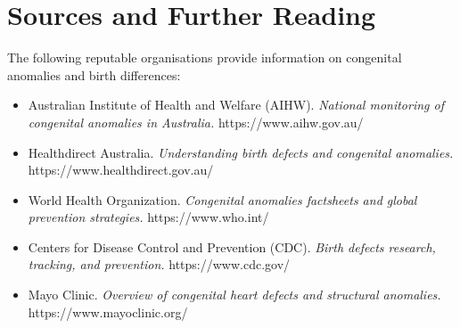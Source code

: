 \section*{Sources and Further Reading}
The following reputable organisations provide information on congenital anomalies and birth differences:
\begin{itemize}
    \item Australian Institute of Health and Welfare (AIHW). \textit{National monitoring of congenital anomalies in Australia.} https://www.aihw.gov.au/
    \item Healthdirect Australia. \textit{Understanding birth defects and congenital anomalies.} https://www.healthdirect.gov.au/
    \item World Health Organization. \textit{Congenital anomalies factsheets and global prevention strategies.} https://www.who.int/
    \item Centers for Disease Control and Prevention (CDC). \textit{Birth defects research, tracking, and prevention.} https://www.cdc.gov/
    \item Mayo Clinic. \textit{Overview of congenital heart defects and structural anomalies.} https://www.mayoclinic.org/
\end{itemize}
